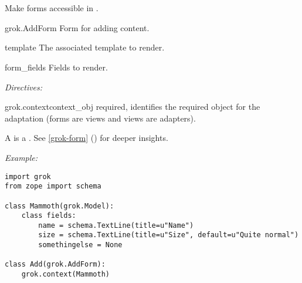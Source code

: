 \section{}
\label{grok-addform}

    Make  forms accessible in .

    \begin{classdesc*}{grok.AddForm}
      Form for adding content.

        \begin{memberdesc}{template}
            The associated template to render.
        \end{memberdesc}

        \begin{memberdesc}{form_fields}
            Fields to render. 
        \end{memberdesc}

        \emph{Directives:}

        \begin{methoddesc}{grok.context}{context_obj}
          required, identifies the required object for the adaptation
          (forms are views and views are adapters).
        \end{methoddesc}


    \end{classdesc*}

    A  is a . See
    \ref{grok-form} () for deeper insights.

    
    \emph{Example:}
\begin{verbatim}
import grok
from zope import schema

class Mammoth(grok.Model):
    class fields:
        name = schema.TextLine(title=u"Name")
        size = schema.TextLine(title=u"Size", default=u"Quite normal")
        somethingelse = None

class Add(grok.AddForm):
    grok.context(Mammoth)
\end{verbatim}

\section{}

\section{}

